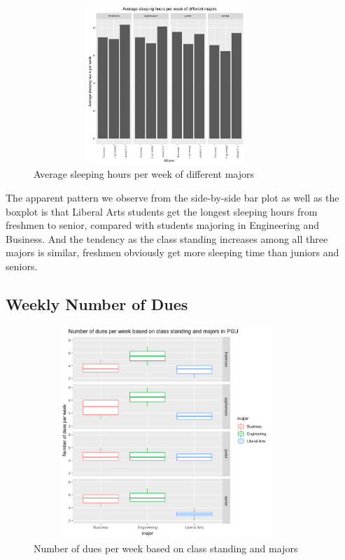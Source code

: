\documentclass{article} %
\begin{document}
\begin{figure}[H]
	\begin{center}
		\includegraphics[height=6cm, width=10cm]{2.png}
	\end{center}
	\caption{Average sleeping hours per week of different majors}
\end{figure}




The apparent pattern we observe from the side-by-side bar plot as well as the boxplot is that Liberal Arts students get the longest sleeping hours from freshmen to senior, compared with students majoring in Engineering and Business. And the tendency as the class standing increases among all three majors is similar, freshmen obviously get more sleeping time than juniors and seniors.


\subsection{Weekly Number of Dues}

\begin{figure}[H]
	\begin{center}
		\includegraphics[height=8cm, width=10cm]{5.png}
	\end{center}
	\caption{Number of dues per week based on class standing and majors}
\end{figure}
\end{document}
